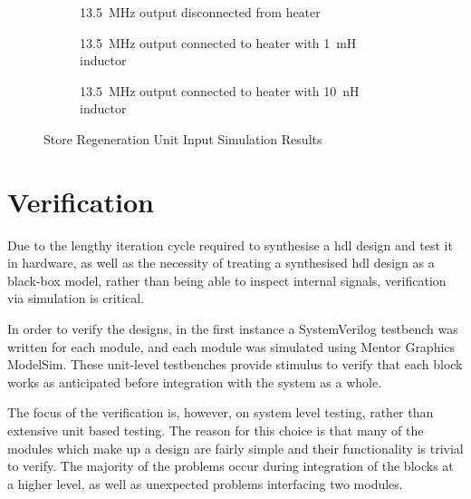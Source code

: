 \begin{figure}[ht]
	\centering
	
	\begin{subfigure}[b]{\textwidth}
		\centering
		\caption{\SI{13.5}{\mega\hertz} output disconnected from heater}
		\label{fig:rf-disconnected}
	\end{subfigure}

	\begin{subfigure}[b]{\textwidth}
		\centering
		\caption{\SI{13.5}{\mega\hertz} output connected to heater with \SI{1}{\milli\henry} inductor}
		\label{fig:rf-1mh}
	\end{subfigure}

	\begin{subfigure}[b]{\textwidth}
		\centering
		\caption{\SI{13.5}{\mega\hertz} output connected to heater with \SI{10}{\nano\henry} inductor}
		\label{fig:rf-10nh}
	\end{subfigure}
	
	
	\caption{Store Regeneration Unit Input Simulation Results}
	\label{fig:store-regen-input-sim-res}
\end{figure}


\section{ Verification}
Due to the lengthy iteration cycle required to synthesise a \gls{hdl} design and test it in hardware, as well as the necessity of treating a synthesised \gls{hdl} design as a black-box model, rather than being able to inspect internal signals, verification via simulation is critical.

In order to verify the designs, in the first instance a SystemVerilog testbench was written for each module, and each module was simulated using Mentor Graphics ModelSim. These unit-level testbenches provide stimulus to verify that each block works as anticipated before integration with the system as a whole.

The focus of the verification is, however, on system level testing, rather than extensive unit based testing. The reason for this choice is that many of the modules which make up a design are fairly simple and their functionality is trivial to verify. The majority of the problems occur during integration of the blocks at a higher level, as well as unexpected problems interfacing two modules.

